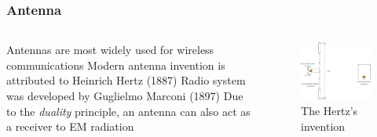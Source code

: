 \documentclass[10pt, compress]{beamer}
\begin{document}
\begin{frame}
  \frametitle{Antenna}
  \begin{columns}[T] %
    \begin{column}{.4\textwidth}
      \begin{outline}
        \1 Antennas are most widely used for wireless communications
        \1 Modern antenna invention is attributed to Heinrich Hertz (1887)
        \2 Radio system was developed by Guglielmo Marconi (1897)
        \1 Due to the \textit{duality} principle, an antenna can also act as a receiver to EM radiation
      \end{outline}
    \end{column}
    \begin{column}[T]{.6\textwidth}
      \begin{figure}
        \centering
        \includegraphics[width=.9\textwidth]{antenna_hertz.pdf}
        \caption{The Hertz's invention}
      \end{figure}
    \end{column}%
  \end{columns}
\end{frame}
\end{document}
